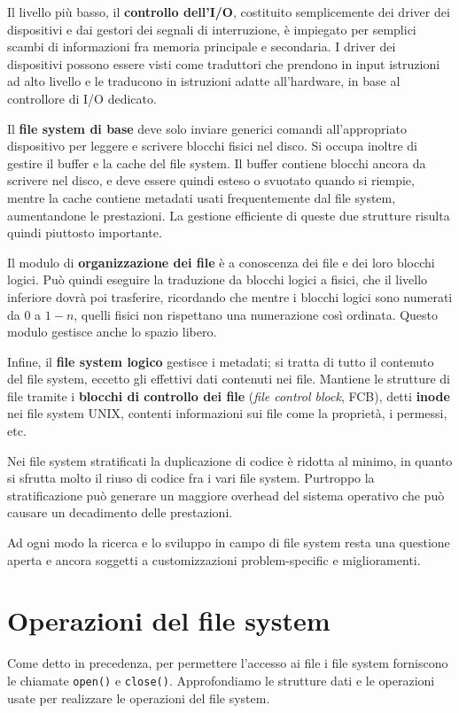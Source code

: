     \newpage
    
    Il livello più basso, il \textbf{controllo dell'I/O}, costituito semplicemente dei driver dei dispositivi e dai gestori dei segnali di interruzione, è impiegato per semplici scambi di informazioni fra memoria principale e secondaria. I driver dei dispositivi possono essere visti come traduttori che prendono in input istruzioni ad alto livello e le traducono in istruzioni adatte all'hardware, in base al controllore di I/O dedicato.
    
    Il \textbf{file system di base} deve solo inviare generici comandi all'appropriato dispositivo per leggere e scrivere blocchi fisici nel disco. Si occupa inoltre di gestire il buffer e la cache del file system. Il buffer contiene blocchi ancora da scrivere nel disco, e deve essere quindi esteso o svuotato quando si riempie, mentre la cache contiene metadati usati frequentemente dal file system, aumentandone le prestazioni. La gestione efficiente di queste due strutture risulta quindi piuttosto importante.
    
    Il modulo di \textbf{organizzazione dei file} è a conoscenza dei file e dei loro blocchi logici. Può quindi eseguire la traduzione da blocchi logici a fisici, che il livello inferiore dovrà poi trasferire, ricordando che mentre i blocchi logici sono numerati da $0$ a $1-n$, quelli fisici non rispettano una numerazione così ordinata. Questo modulo gestisce anche lo spazio libero.
    
    Infine, il \textbf{file system logico} gestisce i metadati; si tratta di tutto il contenuto del file system, eccetto gli effettivi dati contenuti nei file. Mantiene le strutture di file tramite i \textbf{blocchi di controllo dei file} (\textit{file control block}, FCB), detti \textbf{inode} nei file system UNIX, contenti informazioni sui file come la proprietà, i permessi, etc.
    
    Nei file system stratificati la duplicazione di codice è ridotta al minimo, in quanto si sfrutta molto il riuso di codice fra i vari file system. Purtroppo la stratificazione può generare un maggiore overhead del sistema operativo che può causare un decadimento delle prestazioni.
    
    Ad ogni modo la ricerca e lo sviluppo in campo di file system resta una questione aperta e ancora soggetti a customizzazioni problem-specific e miglioramenti.
    
\section{Operazioni del file system}
    Come detto in precedenza, per permettere l'accesso ai file i file system forniscono le chiamate \texttt{open()} e \texttt{close()}. Approfondiamo le strutture dati e le operazioni usate per realizzare le operazioni del file system.
    
